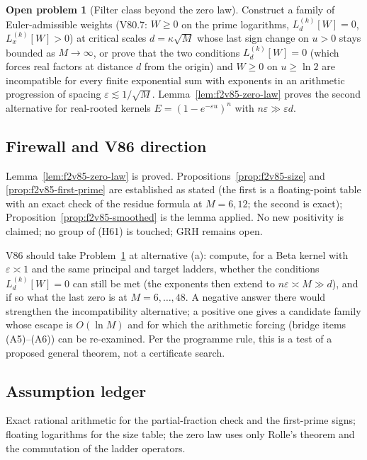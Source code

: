 \documentclass[11pt]{article}
\theoremstyle{definition}
\newtheorem{problem}[theorem]{Open problem}
\theoremstyle{remark}
\begin{document}
\begin{problem}[Filter class beyond the zero law]
\label{prob:f2v85-class}
Construct a family of Euler-admissible weights (V80.7: \(W\ge0\) on the
prime logarithms, \(L^{(k)}_d[W]=0\), \(L^{(k)}_x[W]>0\)) at critical
scales \(d=\kappa\sqrt M\) whose last sign change on \(u>0\) stays
bounded as \(M\to\infty\), or prove that the two conditions
\(L^{(k)}_d[W]=0\) (which forces real factors at distance \(d\) from the
origin) and \(W\ge0\) on \(u\ge\ln2\) are incompatible for every
finite exponential sum with exponents in an arithmetic progression of
spacing \(\varepsilon\lesssim1/\sqrt M\).  Lemma~\ref{lem:f2v85-zero-law}
proves the second alternative for real-rooted kernels
\(E=(1-e^{-\varepsilon u})^n\) with \(n\varepsilon\gg\varepsilon d\).
\end{problem}

\subsection*{Firewall and V86 direction}
\label{fire:f2v85}
Lemma~\ref{lem:f2v85-zero-law} is proved.
Propositions~\ref{prop:f2v85-size} and \ref{prop:f2v85-first-prime} are
established as stated (the first is a floating-point table with an exact
check of the residue formula at \(M=6,12\); the second is exact);
Proposition~\ref{prop:f2v85-smoothed} is the lemma applied.  No new
positivity is claimed; no group of (H61) is touched; GRH remains open.

V86 should take Problem~\ref{prob:f2v85-class} at alternative (a):
compute, for a Beta kernel with \(\varepsilon\asymp1\) and the same
principal and target ladders, whether the conditions
\(L^{(k)}_d[W]=0\) can still be met (the exponents then extend to
\(n\varepsilon\asymp M\gg d\)), and if so what the last zero is at
\(M=6,\dots,48\).  A negative answer there would strengthen the
incompatibility alternative; a positive one gives a candidate family
whose escape is \(O(\ln M)\) and for which the arithmetic forcing
(bridge items (A5)--(A6)) can be re-examined.  Per the programme rule,
this is a test of a proposed general theorem, not a certificate search.

\subsection*{Assumption ledger}
\label{ass:f2v85}
Exact rational arithmetic for the partial-fraction check and the
first-prime signs; floating logarithms for the size table; the zero
law uses only Rolle's theorem and the commutation of the ladder
operators.
\endgroup
\end{document}
